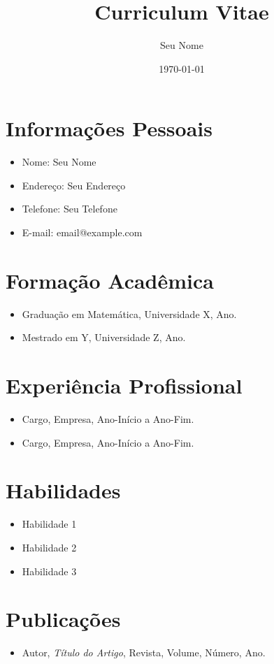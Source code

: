 \documentclass[a4paper,12pt]{article}
\begin{document}
\title{Curriculum Vitae}
\author{Seu Nome}
\date{\today}
\maketitle

\section*{Informações Pessoais}
\begin{itemize}
    \item Nome: Seu Nome
    \item Endereço: Seu Endereço
    \item Telefone: Seu Telefone
    \item E-mail: email@example.com
\end{itemize}

\section*{Formação Acadêmica}
\begin{itemize}
    \item Graduação em Matemática, Universidade X, Ano.
    \item Mestrado em Y, Universidade Z, Ano.
\end{itemize}

\section*{Experiência Profissional}
\begin{itemize}
    \item Cargo, Empresa, Ano-Início a Ano-Fim.
    \item Cargo, Empresa, Ano-Início a Ano-Fim.
\end{itemize}

\section*{Habilidades}
\begin{itemize}
    \item Habilidade 1
    \item Habilidade 2
    \item Habilidade 3
\end{itemize}

\section*{Publicações}
\begin{itemize}
    \item Autor, \textit{Título do Artigo}, Revista, Volume, Número, Ano.
\end{itemize}
\end{document}
